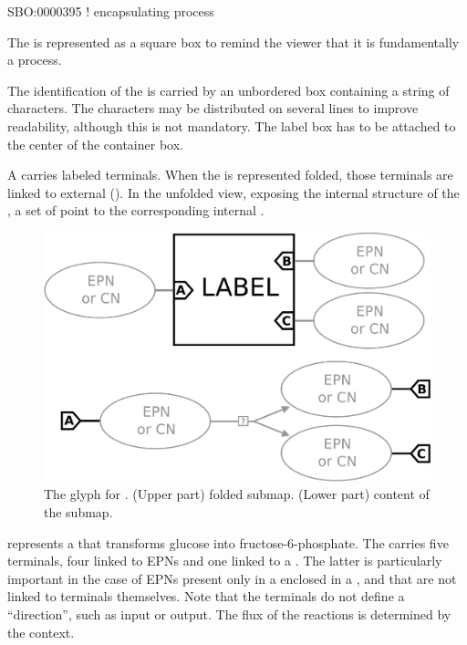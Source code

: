 \begin{glyphDescription}

\glyphSboTerm SBO:0000395 ! encapsulating process

\glyphContainer The  is represented as a square box to remind the viewer that it is fundamentally a process.

\glyphLabel The identification of the  is carried by an unbordered box containing a string of characters.  The characters may be distributed on several lines to improve readability, although this is not mandatory.  The label box has to be attached to the center of the container box.

\glyphAux A  carries labeled terminals.  When the  is represented folded, those terminals are linked to external  ().  In the unfolded view, exposing the internal structure of the , a set of  point to the corresponding internal  .

\end{glyphDescription}


\begin{figure}[H]
  \centering
  \includegraphics[scale = 0.22]{images/submap}
  \caption{The \PD glyph for . (Upper part) folded submap. (Lower part) content of the submap.}
  \label{fig:submap}
\end{figure}

 represents a  that transforms glucose into fructose-6-phosphate. The  carries five terminals, four linked to EPNs and one linked to a .  The latter is particularly important in the case of EPNs present only in a  enclosed in a , and that are not linked to terminals themselves.  Note that the terminals do not define a ``direction'', such as input or output.  The flux of the reactions is determined by the context.

